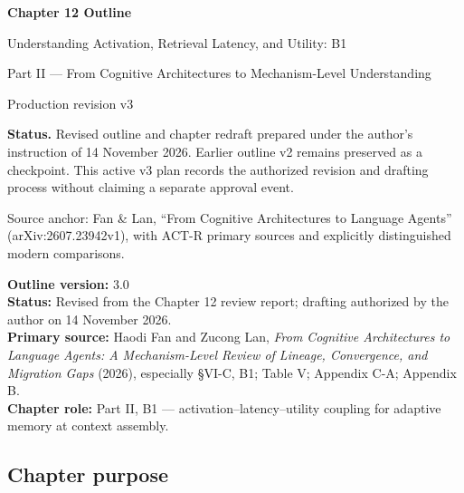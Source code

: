


\thispagestyle{empty}
\begin{center}
\vspace*{2.2cm}
{\Huge\bfseries Chapter 12 Outline}\par
\vspace{0.7cm}
{\LARGE Understanding Activation, Retrieval Latency, and Utility: B1}\par
\vspace{0.8cm}
{\Large Part II --- From Cognitive Architectures to Mechanism-Level Understanding}\par
\vspace{1.2cm}
{\large Production revision v3}\par
\vfill
\begin{minipage}{0.82\linewidth}
\begin{learningbox}
\textbf{Status.} Revised outline and chapter redraft prepared under the author's instruction of 14 November 2026. Earlier outline v2 remains preserved as a checkpoint. This active v3 plan records the authorized revision and drafting process without claiming a separate approval event.
\end{learningbox}
\end{minipage}
\vfill
{\large Source anchor: Fan \& Lan, ``From Cognitive Architectures to Language Agents'' (arXiv:2607.23942v1), with ACT-R primary sources and explicitly distinguished modern comparisons.}\par
{}
\vspace{1cm}
\end{center}
\clearpage
\tableofcontents
\clearpage
\textbf{Outline version:} 3.0\\
\textbf{Status:} Revised from the Chapter 12 review report; drafting authorized by the author on 14 November 2026.\\
\textbf{Primary source:} Haodi Fan and Zucong Lan, \emph{From Cognitive Architectures to Language Agents: A Mechanism-Level Review of Lineage, Convergence, and Migration Gaps} (2026), especially §VI-C, B1; Table V; Appendix C-A; Appendix B.\\
\textbf{Chapter role:} Part II, B1 --- activation--latency--utility coupling for adaptive memory at context assembly.

\subsection{Chapter purpose}\label{chapter-purpose}

